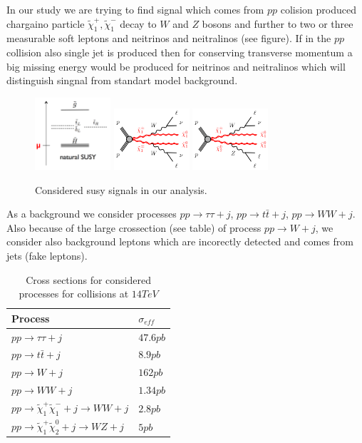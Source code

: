\documentclass[tightenline,notitlepage,nofootinbib]{revtex4-1}
\begin{document}
  In our study we are trying to find signal which comes from $pp$ colision produced chargaino particle $\tilde \chi_1^{+},\tilde \chi_1^{-}$ decay to $W$ and $Z$ bosons and further to two or three measurable soft leptons and neitrinos and neitralinos (see figure). If in the $pp$ collision also single jet is produced then for conserving transverse momentum a big missing energy would be produced for neitrinos and neitralinos which will distinguish singnal from standart model background.
  \begin{figure}[!ht]
    \centering
    \includegraphics[width=0.25\textwidth]{splittings.png}
    \includegraphics[width=0.25\textwidth]{C1C1.png}
    \includegraphics[width=0.25\textwidth]{C1N2.png}
    \caption{Considered susy signals in our analysis.}
  \end{figure}
 As a background we consider processes $pp\rightarrow \tau \tau + j$, $pp\rightarrow t \bar t + j$, $pp \rightarrow WW + j$. Also because of the large crossection (see table) of process $pp \rightarrow W +j$, we consider also background leptons which are incorectly detected and comes from jets (fake leptons). 
\begin{table}[!ht]
  \centering
  \begin{tabular}{ll}
    Process & $\sigma_{eff}$ \\
    \hline
    $pp\rightarrow \tau \tau + j$ & $47.6 pb$\\
    $pp\rightarrow t \bar t + j$ & $ 8.9pb$\\
    $pp \rightarrow W + j$ &  $162pb$ \\
    $pp \rightarrow WW +j$ & $1.34 pb$\\
    $pp \rightarrow \tilde \chi_1^{+}\tilde \chi_1^{-} + j \rightarrow WW + j$ & $2.8pb$\\
    $pp \rightarrow \tilde \chi_1^{+}\tilde \chi_2^{0} + j \rightarrow WZ + j$ & $5pb$\\
  \end{tabular}
  \caption{Cross sections for considered processes for collisions at $14 TeV$}
\end{table}
\end{document}
